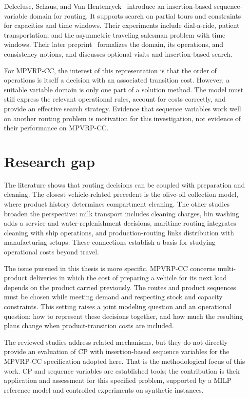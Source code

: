 Delecluse, Schaus, and Van Hentenryck~\cite{delecluse2022sequence} introduce
an insertion-based sequence-variable domain for routing. It supports search
on partial tours and constraints for capacities and time windows. Their
experiments include dial-a-ride, patient transportation, and the asymmetric
traveling salesman problem with time windows. Their later
preprint~\cite{delecluse2025sequence} formalizes the domain, its operations,
and consistency notions, and discusses optional visits and insertion-based
search.

For MPVRP-CC, the interest of this representation is that the order of
operations is itself a decision with an associated transition cost. However,
a suitable variable domain is only one part of a solution method. The model
must still express the relevant operational rules, account for costs
correctly, and provide an effective search strategy. Evidence that sequence
variables work well on another routing problem is motivation for this
investigation, not evidence of their performance on MPVRP-CC.

\section{Research gap}\label{sec:research-gap}

The literature shows that routing decisions can be coupled with preparation
and cleaning. The closest vehicle-related precedent is the olive-oil
collection model, where product history determines compartment cleaning.
The other studies broaden the perspective: milk transport includes cleaning
charges, bin washing adds a service and water-replenishment decisions,
maritime routing integrates cleaning with ship operations, and
production-routing links distribution with manufacturing setups. These
connections establish a basis for studying operational costs beyond travel.

The issue pursued in this thesis is more specific. MPVRP-CC concerns
multi-product deliveries in which the cost of preparing a vehicle for its
next load depends on the product carried previously. The routes and product
sequences must be chosen while meeting demand and respecting stock and
capacity constraints. This setting raises a joint modeling question and an
operational question: how to represent these decisions together, and how
much the resulting plans change when product-transition costs are included.

The reviewed studies address related mechanisms, but they do not directly
provide an evaluation of CP with insertion-based sequence variables for the
MPVRP-CC specification adopted here. That is the methodological focus of this
work. CP and sequence variables are established tools; the contribution is
their application and assessment for this specified problem, supported by a
MILP reference model and controlled experiments on synthetic instances.


